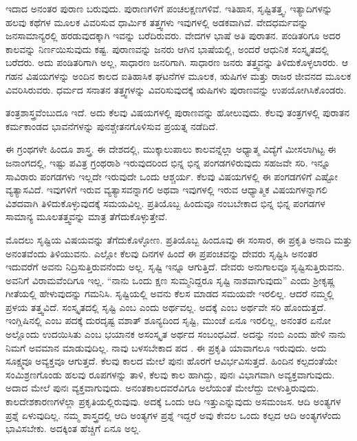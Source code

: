 ಇದಾದ ಅನಂತರ ಪುರಾಣ ಬರುವುದು. ಪುರಾಣಗಳಿಗೆ ಪಂಚಲಕ್ಷಣಗಳಿವೆ. ಇತಿಹಾಸ, ಸೃಷ್ಟಿತತ್ತ್ವ, ಇತ್ಯಾದಿಗಳನ್ನು ಹಲವು ಕಥೆಗಳ ಮೂಲಕ ವಿವರಿಸುವ ಧಾರ್ಮಿಕ ತತ್ತ್ವಗಳು ಇವುಗಳಲ್ಲಿ ಅಡಕವಾಗಿವೆ. ವೇದಧರ್ಮವನ್ನು ಜನಸಾಮಾನ್ಯರಲ್ಲಿ ಹರಡುವುದಕ್ಕಾಗಿ ಇವನ್ನು ಬರೆದಿರುವರು. ವೇದಗಳ ಭಾಷೆ ಅತಿ ಪುರಾತನ. ಪಂಡಿತರಿಗೂ ಅದರ ಕಾಲವನ್ನು ನಿರ್ಣಯಿಸುವುದು ಕಷ್ಟ. ಪುರಾಣವನ್ನು ಜನರು ಆಗಿನ ಭಾಷೆಯಲ್ಲಿ, ಅಂದರೆ ಆಧುನಿಕ ಸಂಸ್ಕೃತದಲ್ಲಿ ಬರೆದರು. ಅದು ಪಂಡಿತರಿಗಾಗಿ ಅಲ್ಲ, ಸಾಧಾರಣ ಜನರಿಗಾಗಿ. ಸಾಧಾರಣ ಜನರು ತತ್ತ್ವವನ್ನು ತಿಳಿದುಕೊಳ್ಳಲಾರರು. ಆ ಗಹನ ವಿಷಯಗಳನ್ನು ಅಂದಿನ ಕಾಲದ ಐತಿಹಾಸಿಕ ಘಟನೆಗಳ ಮೂಲಕ, ಋಷಿಗಳ ಮತ್ತು ರಾಜರ ಜೀವನದ ಮೂಲಕ ವಿವರಿಸಿರುವರು. ಧರ್ಮದ ಸನಾತನ ತತ್ತ್ವಗಳನ್ನು ವಿವರಿಸುವುದಕ್ಕೆ ಋಷಿಗಳು ಪುರಾಣವನ್ನು ಉಪಯೋಗಿಸಿಕೊಂಡರು.

ತಂತ್ರಶಾಸ್ತ್ರವೆಂಬುದೂ ಇದೆ. ಅದು ಕೆಲವು ವಿಷಯಗಳಲ್ಲಿ ಪುರಾಣವನ್ನು ಹೋಲುವುದು. ಕೆಲವು ತಂತ್ರಗಳಲ್ಲಿ ಪುರಾತನ ಕರ್ಮಕಾಂಡದ ಭಾವನೆಗಳನ್ನು ಪುನಶ್ಚೇತನಗೊಳಿಸುವ ಪ್ರಯತ್ನ ನಡೆದಿದೆ.

ಈ ಗ್ರಂಥಗಳೇ ಹಿಂದೂ ಶಾಸ್ತ್ರ. ಈ ದೇಶದಲ್ಲಿ, ಮುಕ್ಕಾಲುಪಾಲು ಕಾಲವನ್ನೆಲ್ಲಾ ಅಧ್ಯಾತ್ಮ ವಿದ್ಯೆಗೆ ಮೀಸಲಾಗಿಟ್ಟ ಈ ಜನಾಂಗದಲ್ಲಿ, ಇಷ್ಟು ಪವಿತ್ರ ಗ್ರಂಥರಾಶಿ ಇರುವುದರಿಂದ ಭಿನ್ನ ಭಿನ್ನ ಪಂಗಡಗಳಿರುವುದು ಸಹಜವೇ ಸರಿ. ಇನ್ನೂ ಸಾವಿರಾರು ಪಂಗಡಗಳು ಇಲ್ಲದೇ ಇರುವುದೇ ಒಂದು ಆಶ್ಚರ್ಯ. ಕೆಲವು ವಿಷಯಗಳಲ್ಲಿ ಈ ಪಂಗಡಗಳಿಗೆ ಎಷ್ಟೋ ವ್ಯತ್ಯಾಸವಿದೆ. ಇವುಗಳಿಗೆ ಇರುವ ವ್ಯತ್ಯಾಸವನ್ನಾಗಲಿ ಅಥವಾ ಇವುಗಳಲ್ಲಿ ಇರುವ ಆಧ್ಯಾತ್ಮಿಕ ವಿಷಯಗಳನ್ನಾಗಲಿ ವಿಶದವಾಗಿ ತಿಳಿದುಕೊಳ್ಳುವುದಕ್ಕೆ ಸಮಯವಿಲ್ಲ. ಪ್ರತಿಯೊಬ್ಬ ಹಿಂದುವೂ ನಂಬಬೇಕಾದ ಭಿನ್ನ ಭಿನ್ನ ಪಂಗಡಗಳ ಸಾಮಾನ್ಯ ಮೂಲತತ್ತ್ವವನ್ನು ಮಾತ್ರ ತೆಗೆದುಕೊಳ್ಳುತ್ತೇವೆ.

ಮೊದಲು ಸೃಷ್ಟಿಯ ವಿಷಯವನ್ನು ತೆಗೆದುಕೊಳ್ಳೋಣ. ಪ್ರತಿಯೊಬ್ಬ \break ಹಿಂದೂವು ಈ ಸಂಸಾರ, ಈ ಪ್ರಕೃತಿ ಅನಾದಿ ಮತ್ತು ಅನಂತವೆಂದು ತಿಳಿಯುವನು. ಎಲ್ಲೋ ಕೆಲವು ದಿನಗಳ ಹಿಂದೆ ಈ ಪ್ರಪಂಚವನ್ನು ದೇವರು ಸೃಷ್ಟಿಸಿ ಅನಂತರ ಇದುವರೆಗೆ ಅವನು ನಿದ್ರಿಸುತ್ತಿರುವನೆಂದು ಅಲ್ಲ. ಸೃಷ್ಟಿ ಇನ್ನೂ ಆಗುತ್ತಿದೆ. ದೇವರು ಅನುಗಾಲವೂ ಸೃಷ್ಟಿಸುತ್ತಿರುವನು. ಅವನಿಗೆ ವಿರಾಮವೆಂದಿಗೂ ಇಲ್ಲ. “ನಾನು ಒಂದು ಕ್ಷಣ ಸುಮ್ಮನಿದ್ದರೂ ಸೃಷ್ಟಿ ನಾಶವಾಗುವುದು” ಎಂದು ಶ‍್ರೀಕೃಷ್ಣ ಗೀತೆಯಲ್ಲಿ ಹೇಳುವುದನ್ನು ಗಮನಿಸಿ. ಸೃಷ್ಟಿಯಲ್ಲಿ ಅವನು ಕೆಲಸ ಮಾಡದ ಸಮಯವೇ ಇರಲಿಲ್ಲ. ಆದರೆ ನಮ್ಮಲ್ಲಿ ಪ್ರಳಯ ತತ್ತ್ವವಿದೆ. ಸಂಸ್ಕೃತದಲ್ಲಿ ಸೃಷ್ಟಿ ಎಂಬ  ಎಂದು ಅರ್ಥವಲ್ಲ. ಅದಕ್ಕೆ  ಎಂಬ ಅರ್ಥವೇ ಸರಿ ಹೊಂದುತ್ತದೆ. ಇಂಗ್ಲಿಷಿನಲ್ಲಿ  ಎಂಬ ಪದಕ್ಕೆ ದುರದೃಷ್ಟ ವಶಾತ್​ ಶೂನ್ಯದಿಂದ ಸೃಷ್ಟಿ, ಮುಂಚೆ ಏನೂ ಇರಲಿಲ್ಲ, ಅನಂತರ ಏನೋ ಅಲ್ಲೊಂದು ಉದಯಿಸಿತು ಎಂಬ ಭಯಾನಕ ಅಸಂಸ್ಕೃತ ಅರ್ಥದ ಸಂಬಂಧವಿದೆ. ಅದನ್ನು ನಂಬಿ ಎಂದು ಹೇಳಿ ನಾನು ನಿಮಗೆ ಅವಮಾನ ಮಾಡುವುದಿಲ್ಲ. ನಾವು ಬಳಸಬೇಕಾದ ಪದ . ಈ ಪ್ರಕೃತಿ ಯಾವಾಗಲೂ ಇರುವುದು. ಅದು ಸೂಕ್ಷ್ಮವೂ ಅವ್ಯಕ್ತವೂ ಆಗುತ್ತದೆ. ಕೆಲವು ಕಾಲದ ಮೇಲೆ ಪುನಃ ಹೊರಗೆ ಆವಿರ್ಭವಿಸುತ್ತದೆ. ಹಿಂದಿನ ಕಲ್ಪದಂತೆಯೇ ಸಂಮಿಶ್ರಣಗೊಂಡು ಹಲವು ರೂಪಗಳನ್ನು ತಾಳಿ, ಕೆಲವು ಕಾಲ ಹಾಗಿದ್ದು, ಪುನಃ ವಿಭಾಗವಾಗಿ ಅವ್ಯಕ್ತವಾಗುವುದು. ಅದಾದ ಮೇಲೆ ಪುನಃ ವ್ಯಕ್ತವಾಗುವುದು. ಅನಂತಕಾಲದವರೆವಿಗೂ ಅಲೆಯಂತೆ ಮೇಲೆದ್ದು ಬೀಳುತ್ತಿರುವುದು. ಕಾಲದೇಶಕಾರಣಗಳೆಲ್ಲಾ ಪ್ರಕೃತಿಯಲ್ಲಿರುವುವು. ಅದಕ್ಕೆ ಒಂದು ಆದಿ ಇತ್ತು\break ಎನ್ನುವುದು ಅಸಮಂಜಸ. ಆದಿ ಅಂತ್ಯಗಳ ಪ್ರಶ್ನೆ ಏಳುವುದಿಲ್ಲ. ನಮ್ಮ ಶಾಸ್ತ್ರದಲ್ಲಿ ಆದಿ ಅಂತ್ಯಗಳ ಪ್ರಶ್ನೆ ಇದ್ದರೆ ಅವು ಕೇವಲ ಒಂದು ಕಲ್ಪದ ಆದಿ ಅಂತ್ಯಗಳೆಂದು ಭಾವಿಸಬೇಕು. ಅದಕ್ಕಿಂತ ಹೆಚ್ಚಿಗೆ ಏನೂ ಅಲ್ಲ.

